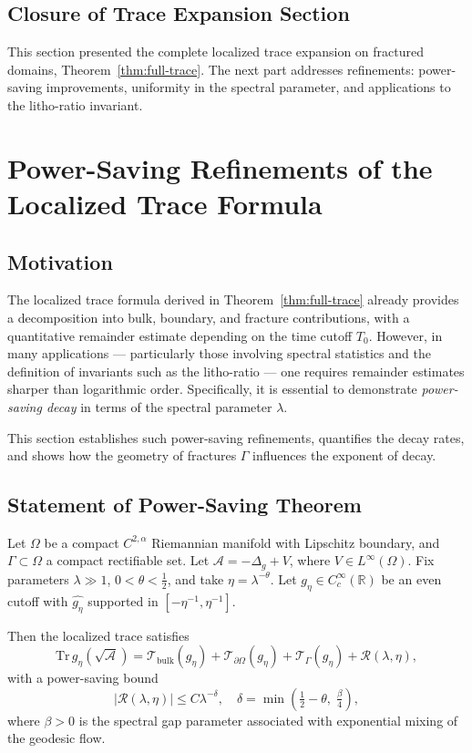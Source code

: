 \subsection*{Closure of Trace Expansion Section}

This section presented the complete localized trace expansion on fractured
domains, Theorem~\ref{thm:full-trace}. The next part addresses refinements:
power-saving improvements, uniformity in the spectral parameter, and
applications to the litho-ratio invariant.

\section{Power-Saving Refinements of the Localized Trace Formula}
\label{sec:power-saving}

\subsection{Motivation}

The localized trace formula derived in Theorem~\ref{thm:full-trace} already
provides a decomposition into bulk, boundary, and fracture contributions,
with a quantitative remainder estimate depending on the time cutoff $T_0$.
However, in many applications — particularly those involving spectral
statistics and the definition of invariants such as the litho-ratio — one
requires remainder estimates sharper than logarithmic order. Specifically,
it is essential to demonstrate \emph{power-saving decay} in terms of the
spectral parameter $\lambda$.

This section establishes such power-saving refinements, quantifies the
decay rates, and shows how the geometry of fractures $\Gamma$ influences
the exponent of decay.

\subsection{Statement of Power-Saving Theorem}

\begin{theorem}
\label{thm:power-saving}
Let $\Omega$ be a compact $C^{2,\alpha}$ Riemannian manifold with Lipschitz
boundary, and $\Gamma \subset \Omega$ a compact rectifiable set.
Let $\mathcal{A} = -\Delta_g + V$, where $V \in L^\infty(\Omega)$.
Fix parameters $\lambda \gg 1$, $0 < \theta < \tfrac{1}{2}$, and take
$\eta = \lambda^{-\theta}$. Let $g_\eta \in C_c^\infty(\mathbb{R})$ be
an even cutoff with $\widehat{g_\eta}$ supported in $[-\eta^{-1}, \eta^{-1}]$.

Then the localized trace satisfies
\[
\mathrm{Tr}\, g_\eta(\sqrt{\mathcal{A}}) =
\mathcal{T}_{\mathrm{bulk}}(g_\eta) +
\mathcal{T}_{\partial \Omega}(g_\eta) +
\mathcal{T}_\Gamma(g_\eta) +
\mathcal{R}(\lambda,\eta),
\]
with a power-saving bound
\[
|\mathcal{R}(\lambda,\eta)| \leq C \lambda^{-\delta},
\quad
\delta = \min\left(\tfrac{1}{2} - \theta,\; \tfrac{\beta}{4}\right),
\]
where $\beta > 0$ is the spectral gap parameter associated with
exponential mixing of the geodesic flow.
\end{theorem}

